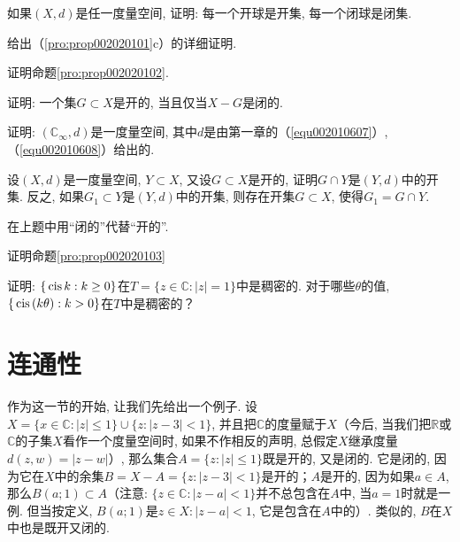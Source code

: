 \begin{exercise}
如果$(X, d)$是任一度量空间, 证明: 每一个开球是开集, 每一个闭球是闭集. 
\end{exercise}

\begin{exercise}
给出（\ref{pro:prop002020101}c）的详细证明. 
\end{exercise}

\begin{exercise}
证明命题\ref{pro:prop002020102}. 
\end{exercise}

\begin{exercise}
证明: 一个集$G \subset X$是开的, 当且仅当$X-G$是闭的. 
\end{exercise}

\begin{exercise}
证明: $(\mathbb{C}_{\infty}, d)$是一度量空间, 其中$d$是由第一章的（\ref{equ002010607}）, （\ref{equ002010608}）给出的. 
\end{exercise}

\begin{exercise}\label{exer002020108}
设$(X, d)$是一度量空间, $Y \subset X$, 又设$G \subset X$是开的, 证明$G \cap Y$是$(Y, d)$中的开集. 反之, 如果$G_1 \subset Y$是$(Y, d)$中的开集, 则存在开集$G \subset X$, 使得$G_1 = G \cap Y$. 
\end{exercise}

\begin{exercise}\label{exer002020109}
在上题中用“闭的”代替“开的”. 
\end{exercise}

\begin{exercise}
证明命题\ref{pro:prop002020103}
\end{exercise}

\begin{exercise}
证明: $\{\,\text{cis}\,{k}:k \ge 0\}$在$T=\{z \in \mathbb{C}:|z|=1\}$中是稠密的. 对于哪些$\theta$的值, $\{\,\text{cis}\,(k\theta):k>0\}$在$T$中是稠密的？
\end{exercise}

\section{连通性}\label{subsection0020202}
作为这一节的开始, 让我们先给出一个例子. 设$X = \{ x \in \mathbb{C} : |z| \le 1\} \cup \{z: |z-3| < 1\}$, 并且把$\mathbb{C}$的度量赋于$X$（今后, 当我们把$\mathbb{R}$或$\mathbb{C}$的子集$X$看作一个度量空间时, 如果不作相反的声明, 总假定$X$继承度量$d(z, w) = |z-w|$）, 那么集合$A = \{z:|z| \le 1\}$既是开的, 又是闭的. 它是闭的, 因为它在$X$中的余集$B = X-A = \{z:|z-3| < 1\}$是开的；$A$是开的, 因为如果$a \in A$, 那么$B(a;1) \subset A$（注意: $\{z \in \mathbb{C}: |z-a| < 1\}$并不总包含在$A$中, 当$a=1$时就是一例. 但当按定义, $B(a;1)$是$z \in X: |z-a|<1$, 它是包含在$A$中的）. 类似的, $B$在$X$中也是既开又闭的. 

